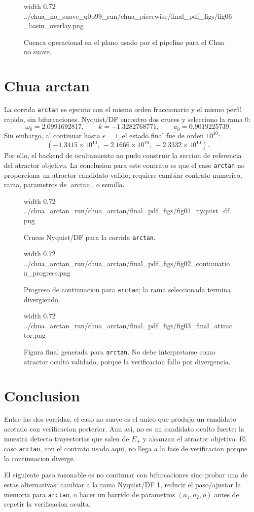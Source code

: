 \documentclass[11pt]{article}
\newcommand{\img}[2]{%
  \begingroup
  \pdfximage width #1 {#2}%
  \pdfrefximage\pdflastximage
  \endgroup
}
\begin{document}
\begin{figure}[H]
\centering
\img{0.72\textwidth}{../chua_no_suave_q0p99_run/chua_piecewise/final_pdf_figs/fig06_basin_overlay.png}
\caption{Cuenca operacional en el plano usado por el pipeline para el Chua no suave.}
\end{figure}

\section*{Chua arctan}

La corrida \texttt{arctan} se ejecuto con el mismo orden fraccionario y el mismo
perfil rapido, sin bifurcaciones. Nyquist/DF encontro dos cruces y selecciono la
rama 0:
\[
  \omega_0 = 2.0991692817,\qquad k=-1.3282768771,\qquad a_0=0.9019225739.
\]
Sin embargo, al continuar hasta \(\epsilon=1\), el estado final fue de orden
\(10^{10}\):
\[
(-1.3415{\times}10^{10},\ -2.1666{\times}10^{10},\ -2.3332{\times}10^{10}).
\]
Por ello, el backend de ocultamiento no pudo construir la seccion de referencia
del atractor objetivo. La conclusion para este contrato es que el caso
\texttt{arctan} no proporciona un atractor candidato valido; requiere cambiar
contrato numerico, rama, parametros de \(\arctan\), o semilla.

\begin{figure}[H]
\centering
\img{0.72\textwidth}{../chua_arctan_run/chua_arctan/final_pdf_figs/fig01_nyquist_df.png}
\caption{Cruces Nyquist/DF para la corrida \texttt{arctan}.}
\end{figure}

\begin{figure}[H]
\centering
\img{0.72\textwidth}{../chua_arctan_run/chua_arctan/final_pdf_figs/fig02_continuation_progress.png}
\caption{Progreso de continuacion para \texttt{arctan}; la rama seleccionada termina divergiendo.}
\end{figure}

\begin{figure}[H]
\centering
\img{0.72\textwidth}{../chua_arctan_run/chua_arctan/final_pdf_figs/fig03_final_attractor.png}
\caption{Figura final generada para \texttt{arctan}. No debe interpretarse como atractor oculto validado, porque la verificacion fallo por divergencia.}
\end{figure}

\section*{Conclusion}

Entre las dos corridas, el caso no suave es el unico que produjo un candidato
acotado con verificacion posterior. Aun asi, no es un candidato oculto fuerte:
la muestra detecto trayectorias que salen de \(E_+\) y alcanzan el atractor
objetivo. El caso \texttt{arctan}, con el contrato usado aqui, no llega a la fase
de verificacion porque la continuacion diverge.

El siguiente paso razonable es no continuar con bifurcaciones sino probar una
de estas alternativas: cambiar a la rama Nyquist/DF 1, reducir el paso/ajustar
la memoria para \texttt{arctan}, o hacer un barrido de parametros \((a_1,a_2,\rho)\)
antes de repetir la verificacion oculta.
\end{document}
